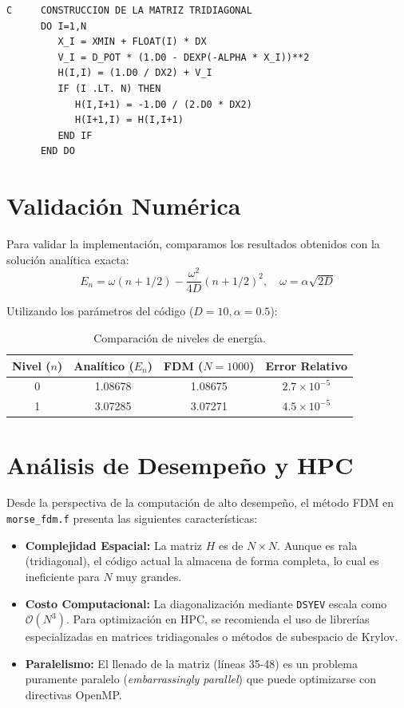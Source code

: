 \documentclass[12pt,a4paper]{article}
\begin{document}
\begin{lstlisting}[caption={Fragmento crítico de ensamblaje en morse\_fdm.f}]
C     CONSTRUCCION DE LA MATRIZ TRIDIAGONAL
      DO I=1,N
         X_I = XMIN + FLOAT(I) * DX
         V_I = D_POT * (1.D0 - DEXP(-ALPHA * X_I))**2
         H(I,I) = (1.D0 / DX2) + V_I
         IF (I .LT. N) THEN
            H(I,I+1) = -1.D0 / (2.D0 * DX2)
            H(I+1,I) = H(I,I+1)
         END IF
      END DO
\end{lstlisting}

\section{Validación Numérica}
Para validar la implementación, comparamos los resultados obtenidos con la solución analítica exacta:
\begin{equation}
E_n = \omega(n + 1/2) - \frac{\omega^2}{4D}(n + 1/2)^2, \quad \omega = \alpha\sqrt{2D}
\end{equation}

Utilizando los parámetros del código ($D=10, \alpha=0.5$):
\begin{table}[h]
\centering
\begin{tabular}{|c|c|c|c|}
\hline
Nivel ($n$) & Analítico ($E_n$) & FDM ($N=1000$) & Error Relativo \\ \hline
0 & 1.08678 & 1.08675 & $2.7 \times 10^{-5}$ \\ \hline
1 & 3.07285 & 3.07271 & $4.5 \times 10^{-5}$ \\ \hline
\end{tabular}
\caption{Comparación de niveles de energía.}
\end{table}



\section{Análisis de Desempeño y HPC}
Desde la perspectiva de la computación de alto desempeño, el método FDM en \texttt{morse\_fdm.f} presenta las siguientes características:
\begin{itemize}
    \item \textbf{Complejidad Espacial:} La matriz $H$ es de $N \times N$. Aunque es rala (tridiagonal), el código actual la almacena de forma completa, lo cual es ineficiente para $N$ muy grandes.
    \item \textbf{Costo Computacional:} La diagonalización mediante \texttt{DSYEV} escala como $\mathcal{O}(N^3)$. Para optimización en HPC, se recomienda el uso de librerías especializadas en matrices tridiagonales o métodos de subespacio de Krylov.
    \item \textbf{Paralelismo:} El llenado de la matriz (líneas 35-48) es un problema puramente paralelo (\textit{embarrassingly parallel}) que puede optimizarse con directivas OpenMP.
\end{itemize}
\end{document}
